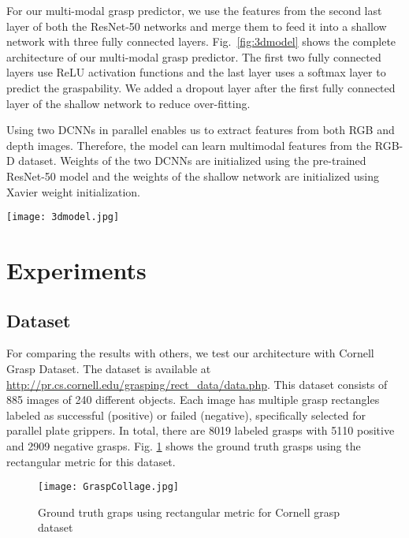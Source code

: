 \documentclass[10pt,twocolumn,letterpaper]{article}
\begin{document}
For our multi-modal grasp predictor, we use the features from the second last layer of both the ResNet-50 networks and merge them to feed it into a shallow network with three fully connected layers. Fig.~\ref{fig:3dmodel} shows the complete architecture of our multi-modal grasp predictor. The first two fully connected layers use ReLU activation functions and the last layer uses a softmax layer to predict the graspability. We added a dropout layer after the first fully connected layer of the shallow network to reduce over-fitting.

Using two DCNNs in parallel enables us to extract features from both RGB and depth images. Therefore, the model can learn multimodal features from the RGB-D dataset. Weights of the two DCNNs are initialized using the pre-trained ResNet-50 model and the weights of the shallow network are initialized using Xavier weight initialization. 

\begin{figure*}[!th]
\begin{center}
\texttt{[image: 3dmodel.jpg]}
\end{center}
   \caption{Complete architecture of our multi-modal grasp detector}
\label{fig:3dmodel}
\end{figure*}



\section{Experiments}
\subsection{Dataset}
For comparing the results with others, we test our architecture with Cornell Grasp Dataset. The dataset is available at \url{http://pr.cs.cornell.edu/grasping/rect_data/data.php}. This dataset consists of 885 images of 240 different objects. Each image has multiple grasp rectangles labeled as successful (positive) or failed (negative), specifically selected for parallel plate grippers. In total, there are 8019 labeled grasps with 5110 positive and 2909 negative grasps. Fig. \ref{fig:GraspCollage} shows the ground truth grasps using the rectangular metric for this dataset.

\begin{figure}[!h]
\begin{center}
\texttt{[image: GraspCollage.jpg]}
\end{center}
   \caption{Ground truth graps using rectangular metric for Cornell grasp dataset}
\label{fig:GraspCollage}
\end{figure}
\end{document}
